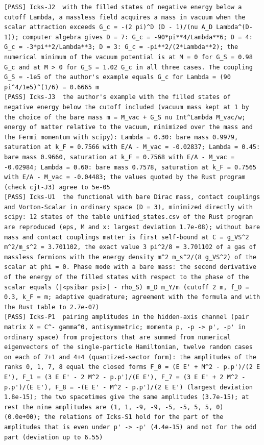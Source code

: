 \documentclass[
  10pt,
]{article}
\begin{document}
\begin{verbatim}
[PASS] Icks-J2  with the filled states of negative energy below a cutoff Lambda, a massless field acquires a mass in vacuum when the scalar attraction exceeds G_c = -(2 pi)^D (D - 1)/(nu A_D Lambda^(D-1)); computer algebra gives D = 7: G_c = -90*pi**4/Lambda**6; D = 4: G_c = -3*pi**2/Lambda**3; D = 3: G_c = -pi**2/(2*Lambda**2); the numerical minimum of the vacuum potential is at M = 0 for G_S = 0.98 G_c and at M > 0 for G_S = 1.02 G_c in all three cases. The coupling G_S = -1e5 of the author's example equals G_c for Lambda = (90 pi^4/1e5)^(1/6) = 0.6665 m
[PASS] Icks-J3  the author's example with the filled states of negative energy below the cutoff included (vacuum mass kept at 1 by the choice of the bare mass m = M_vac + G_S nu Int^Lambda M_vac/w; energy of matter relative to the vacuum, minimized over the mass and the Fermi momentum with scipy): Lambda = 0.30: bare mass 0.9979, saturation at k_F = 0.7566 with E/A - M_vac = -0.02837; Lambda = 0.45: bare mass 0.9660, saturation at k_F = 0.7568 with E/A - M_vac = -0.02984; Lambda = 0.60: bare mass 0.7578, saturation at k_F = 0.7565 with E/A - M_vac = -0.04483; the values quoted by the Rust program (check cjt-J3) agree to 5e-05
[PASS] Icks-U1  the functional with bare Dirac mass, contact couplings and Vorton-Scalar in ordinary space (D = 3), minimized directly with scipy: 12 states of the table unified_states.csv of the Rust program are reproduced (eps, M and x: largest deviation 1.7e-08); without bare mass and contact couplings matter is first self-bound at C = g_VS^2 m^2/m_s^2 = 3.701102, the exact value 3 pi^2/8 = 3.701102 of a gas of massless fermions with the energy density m^2 m_s^2/(8 g_VS^2) of the scalar at phi = 0. Phase mode with a bare mass: the second derivative of the energy of the filled states with respect to the phase of the scalar equals (|<psibar psi>| - rho_S) m_D m_Y/m (cutoff 2 m, f_D = 0.3, k_F = m; adaptive quadrature; agreement with the formula and with the Rust table to 2.7e-07)
[PASS] Icks-P1  pairing amplitudes in the hidden-axis channel (pair matrix X = C^- gamma^0, antisymmetric; momenta p, -p -> p', -p' in ordinary space) from projectors that are summed from numerical eigenvectors of the single-particle Hamiltonian, twelve random cases on each of 7+1 and 4+4 (quantized-sector form): the amplitudes of the ranks 0, 1, 7, 8 equal the closed forms F_0 = (E E' + M^2 - p.p')/(2 E E'), F_1 = (3 E E' - 2 M^2 - p.p')/(E E'), F_7 = (3 E E' + 2 M^2 - p.p')/(E E'), F_8 = -(E E' - M^2 - p.p')/(2 E E') (largest deviation 1.8e-15); the two spacetimes give the same amplitudes (3.7e-15); at rest the nine amplitudes are (1, 1, -9, -9, -5, -5, 5, 5, 0) (0.0e+00); the relations of Icks-S1 hold for the part of the amplitudes that is even under p' -> -p' (4.4e-15) and not for the odd part (deviation up to 6.55)

\end{verbatim}
\end{document}
